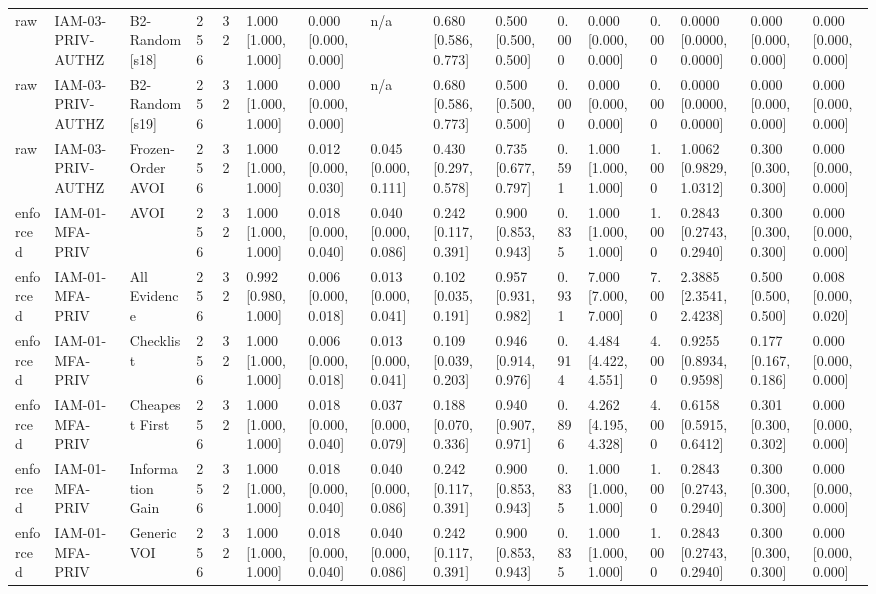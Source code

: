 \begin{table}[!ht]
{\begin{tabular}{llllllllllllllll}
raw & IAM-03-PRIV-AUTHZ & B2-Random[s18] & 256 & 32 & 1.000 [1.000, 1.000] & 0.000 [0.000, 0.000] & n/a & 0.680 [0.586, 0.773] & 0.500 [0.500, 0.500] & 0.000 & 0.000 [0.000, 0.000] & 0.000 & 0.0000 [0.0000, 0.0000] & 0.000 [0.000, 0.000] & 0.000 [0.000, 0.000] \\
raw & IAM-03-PRIV-AUTHZ & B2-Random[s19] & 256 & 32 & 1.000 [1.000, 1.000] & 0.000 [0.000, 0.000] & n/a & 0.680 [0.586, 0.773] & 0.500 [0.500, 0.500] & 0.000 & 0.000 [0.000, 0.000] & 0.000 & 0.0000 [0.0000, 0.0000] & 0.000 [0.000, 0.000] & 0.000 [0.000, 0.000] \\
raw & IAM-03-PRIV-AUTHZ & Frozen-Order AVOI & 256 & 32 & 1.000 [1.000, 1.000] & 0.012 [0.000, 0.030] & 0.045 [0.000, 0.111] & 0.430 [0.297, 0.578] & 0.735 [0.677, 0.797] & 0.591 & 1.000 [1.000, 1.000] & 1.000 & 1.0062 [0.9829, 1.0312] & 0.300 [0.300, 0.300] & 0.000 [0.000, 0.000] \\
enforced & IAM-01-MFA-PRIV & AVOI & 256 & 32 & 1.000 [1.000, 1.000] & 0.018 [0.000, 0.040] & 0.040 [0.000, 0.086] & 0.242 [0.117, 0.391] & 0.900 [0.853, 0.943] & 0.835 & 1.000 [1.000, 1.000] & 1.000 & 0.2843 [0.2743, 0.2940] & 0.300 [0.300, 0.300] & 0.000 [0.000, 0.000] \\
enforced & IAM-01-MFA-PRIV & All Evidence & 256 & 32 & 0.992 [0.980, 1.000] & 0.006 [0.000, 0.018] & 0.013 [0.000, 0.041] & 0.102 [0.035, 0.191] & 0.957 [0.931, 0.982] & 0.931 & 7.000 [7.000, 7.000] & 7.000 & 2.3885 [2.3541, 2.4238] & 0.500 [0.500, 0.500] & 0.008 [0.000, 0.020] \\
enforced & IAM-01-MFA-PRIV & Checklist & 256 & 32 & 1.000 [1.000, 1.000] & 0.006 [0.000, 0.018] & 0.013 [0.000, 0.041] & 0.109 [0.039, 0.203] & 0.946 [0.914, 0.976] & 0.914 & 4.484 [4.422, 4.551] & 4.000 & 0.9255 [0.8934, 0.9598] & 0.177 [0.167, 0.186] & 0.000 [0.000, 0.000] \\
enforced & IAM-01-MFA-PRIV & Cheapest First & 256 & 32 & 1.000 [1.000, 1.000] & 0.018 [0.000, 0.040] & 0.037 [0.000, 0.079] & 0.188 [0.070, 0.336] & 0.940 [0.907, 0.971] & 0.896 & 4.262 [4.195, 4.328] & 4.000 & 0.6158 [0.5915, 0.6412] & 0.301 [0.300, 0.302] & 0.000 [0.000, 0.000] \\
enforced & IAM-01-MFA-PRIV & Information Gain & 256 & 32 & 1.000 [1.000, 1.000] & 0.018 [0.000, 0.040] & 0.040 [0.000, 0.086] & 0.242 [0.117, 0.391] & 0.900 [0.853, 0.943] & 0.835 & 1.000 [1.000, 1.000] & 1.000 & 0.2843 [0.2743, 0.2940] & 0.300 [0.300, 0.300] & 0.000 [0.000, 0.000] \\
enforced & IAM-01-MFA-PRIV & Generic VOI & 256 & 32 & 1.000 [1.000, 1.000] & 0.018 [0.000, 0.040] & 0.040 [0.000, 0.086] & 0.242 [0.117, 0.391] & 0.900 [0.853, 0.943] & 0.835 & 1.000 [1.000, 1.000] & 1.000 & 0.2843 [0.2743, 0.2940] & 0.300 [0.300, 0.300] & 0.000 [0.000, 0.000] \\

\end{tabular}}
\end{table}
